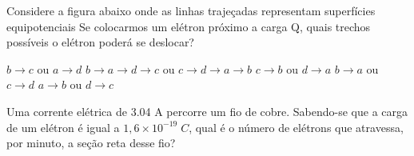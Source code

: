 \documentclass[12pt, addpoints]{exam}
\begin{document}
    \begin{questions}
\begin{multicols*}{2}
\question Considere a figura abaixo onde as linhas trajeçadas representam superfícies equipotenciais Se colocarmos um elétron próximo a carga Q, quais trechos possíveis o elétron poderá se deslocar?
        
        \begin{center}
            \begin{minipage}[c]{0.5\linewidth}
            \end{minipage}
        \end{center}
        
        

\begin{choices}
\choice $b\rightarrow c$ ou $a\rightarrow d$ 
\choice $b\rightarrow a\rightarrow d\rightarrow c$ ou $c\rightarrow d\rightarrow a\rightarrow b$ 
\choice $c\rightarrow b$ ou $d\rightarrow a$ 
\choice $b\rightarrow a$ ou $c\rightarrow d$ 
\choice $a\rightarrow b$ ou $d\rightarrow c$ 
\end{choices}
\question Uma corrente elétrica de    3.04 A percorre um ﬁo de cobre. Sabendo-se que a carga de um elétron é igual a $1,6\times 10^{-19}\;C$, qual é o número de elétrons que atravessa, por minuto, a seção reta desse ﬁo?


\end{multicols*}
\end{questions}
\end{document}
